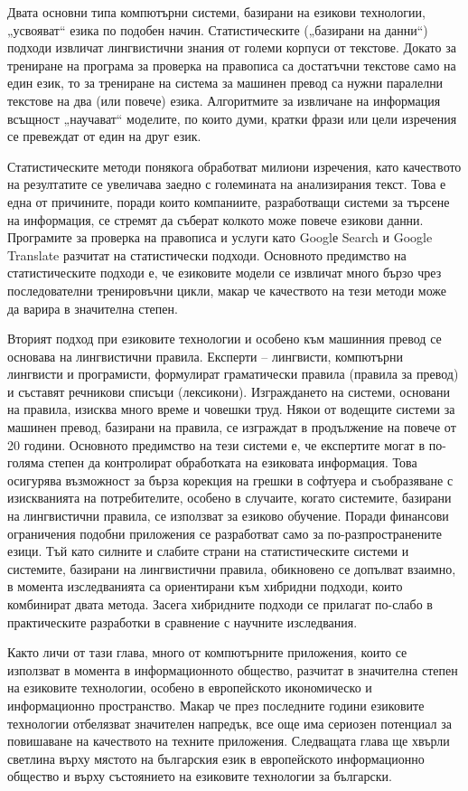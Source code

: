 \documentclass[]{../../metanetpaper}
\begin{document}
\begin{multicols}{2}
Двата основни типа компютърни системи, базирани на езикови технологии, „усвояват“ езика по подобен начин. Статистическите („базирани на данни“) подходи извличат
 лингвистични знания от големи корпуси от текстове. Докато  за трениране на програма за проверка на правописа са достатъчни текстове само на един език, то за трениране на система за машинен превод са нужни паралелни текстове на два (или повече) езика. Алгоритмите за извличане на информация всъщност „научават“ моделите, по които думи, кратки
 фрази или цели изречения се превеждат от един на друг език. 

Статистическите методи понякога обработват милиони изречения, като качеството на резултатите се увеличава заедно с големината на анализирания
 текст. Това е една от причините, поради които компаниите, разработващи системи за търсене на информация, се стремят да съберат колкото
 може повече езикови данни. Програмите за проверка на
 правописа и услуги като Googlе Search и Google Translate разчитат на статистически подходи. Основното предимство на статистическите подходи е, че езиковите модели се извличат много бързо чрез последователни тренировъчни цикли, макар че качеството на тези методи може да варира в значителна степен.

Вторият подход при езиковите технологии и особено към машинния превод се основава на лингвистични правила. Експерти -- лингвисти, компютърни лингвисти и програмисти, формулират  граматически правила (правила за превод) и съставят
 речникови списъци (лексикони). Изграждането на системи, основани на правила, изисква много време и човешки труд. 
Някои от водещите системи за машинен превод, базирани на правила, се
 изграждат в продължение на повече от 20 години. Основното предимство
 на тези системи е, че експертите могат в по-голяма степен да контролират обработката на езиковата информация. 
Това осигурява възможност за бърза корекция на грешки в софтуера и
съобразяване с изискванията на потребителите, особено в случаите, когато системите, базирани на лингвистични правила, се използват за езиково обучение.
Поради финансови ограничения подобни приложения се разработват само за
по-разпространените езици.
%
Тъй като силните и слабите страни на статистическите системи и системите, базирани на лингвистични правила, обикновено се допълват взаимно, в момента изследванията са ориентирани към хибридни подходи, които комбинират  двата метода. Засега хибридните подходи се прилагат по-слабо в практическите разработки в сравнение с научните изследвания. 

Както личи от тази глава, много от компютърните приложения, които се използват в момента в информационното общество, разчитат в значителна степен на езиковите технологии, особено в европейското икономическо и информационно пространство. Макар че през последните години езиковите технологии отбелязват значителен напредък, все още има сериозен потенциал за повишаване на  качеството на техните приложения. Следващата глава ще хвърли светлина върху мястото на българския език в европейското информационно общество и върху състоянието на езиковите технологии за български.  
\end{multicols}
\end{document}
